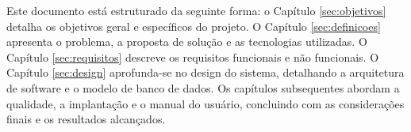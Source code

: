 Este documento está estruturado da seguinte forma: o Capítulo \ref{sec:objetivos} detalha os objetivos geral e específicos do projeto. O Capítulo \ref{sec:definicoes} apresenta o problema, a proposta de solução e as tecnologias utilizadas. O Capítulo \ref{sec:requisitos} descreve os requisitos funcionais e não funcionais. O Capítulo \ref{sec:design} aprofunda-se no design do sistema, detalhando a arquitetura de software e o modelo de banco de dados. Os capítulos subsequentes abordam a qualidade, a implantação e o manual do usuário, concluindo com as considerações finais e os resultados alcançados.
